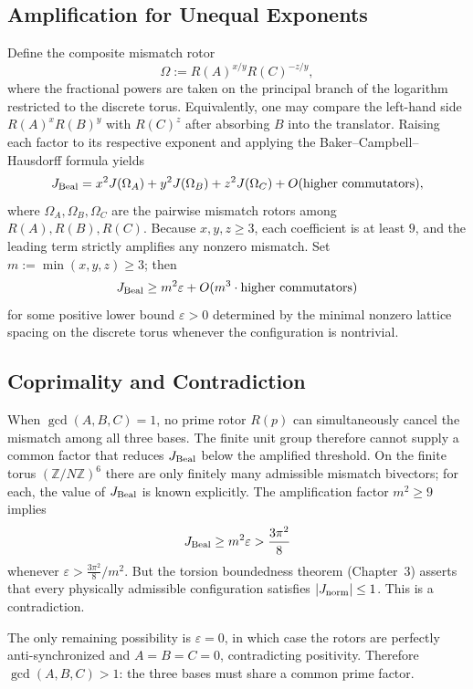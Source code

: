 \documentclass[dvipdfmx,a4paper]{article}
\theoremstyle{definition}
\theoremstyle{remark}
\newcommand{\Jnorm}{J_{\rm norm}}
\newcommand{\Jbound}{\frac{3\pi^2}{8}}
\begin{document}
\subsection{Amplification for Unequal Exponents}

Define the composite mismatch rotor
\[
\Omega := R(A)^{x/y} R(C)^{-z/y},
\]
where the fractional powers are taken on the principal branch of the logarithm restricted to the discrete torus. Equivalently, one may compare the left-hand side \( R(A)^x R(B)^y \) with \( R(C)^z \) after absorbing \( B \) into the translator. Raising each factor to its respective exponent and applying the Baker--Campbell--Hausdorff formula yields
\[
J_{\rm Beal} = x^2 J(\Omega_A) + y^2 J(\Omega_B) + z^2 J(\Omega_C) + O(\text{higher commutators}),
\]
where \( \Omega_A, \Omega_B, \Omega_C \) are the pairwise mismatch rotors among \( R(A), R(B), R(C) \). Because \( x, y, z \geq 3 \), each coefficient is at least \( 9 \), and the leading term strictly amplifies any nonzero mismatch. Set \( m := \min(x,y,z) \geq 3 \); then
\[
J_{\rm Beal} \geq m^2 \varepsilon + O(m^3 \cdot \text{higher commutators})
\]
for some positive lower bound \( \varepsilon > 0 \) determined by the minimal nonzero lattice spacing on the discrete torus whenever the configuration is nontrivial.

\subsection{Coprimality and Contradiction}

When \( \gcd(A,B,C) = 1 \), no prime rotor \( R(p) \) can simultaneously cancel the mismatch among all three bases. The finite unit group therefore cannot supply a common factor that reduces \( J_{\rm Beal} \) below the amplified threshold. On the finite torus \( (\mathbb{Z}/N\mathbb{Z})^6 \) there are only finitely many admissible mismatch bivectors; for each, the value of \( J_{\rm Beal} \) is known explicitly. The amplification factor \( m^2 \geq 9 \) implies
\[
J_{\rm Beal} \geq m^2 \varepsilon > \Jbound
\]
whenever \( \varepsilon > \Jbound / m^2 \). But the torsion boundedness theorem (Chapter~3) asserts that every physically admissible configuration satisfies \( |\Jnorm| \leq 1 \). This is a contradiction.

The only remaining possibility is \( \varepsilon = 0 \), in which case the rotors are perfectly anti-synchronized and \( A = B = C = 0 \), contradicting positivity. Therefore \( \gcd(A,B,C) > 1 \): the three bases must share a common prime factor.
\end{document}

